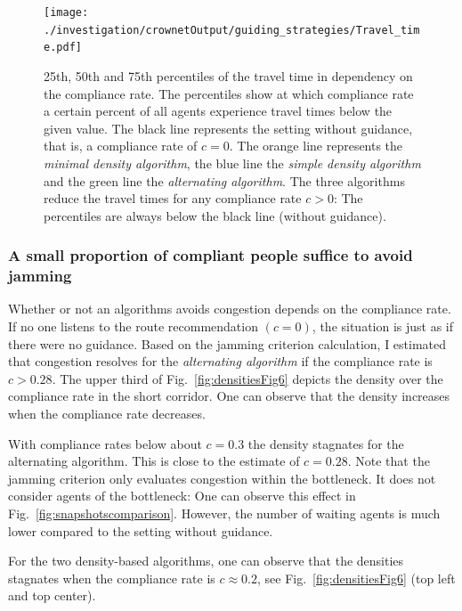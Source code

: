 \begin{figure}[h!]
\texttt{[image: ./investigation/crownetOutput/guiding\_strategies/Travel\_time.pdf]} 
\caption[25th, 50\% and 75\%-quartiles of the travel time in dependency of the compliance rate.]{25th, 50th and 75th percentiles of the travel time in dependency on the compliance rate. The percentiles show at which compliance rate a certain percent of all agents experience travel times below the given value.
The black line represents the setting without guidance, that is, a compliance rate of $c=0$. The orange line represents the \textit{minimal density algorithm}, the blue line the \textit{simple density algorithm} and the green line the \textit{alternating algorithm}.
The three algorithms reduce the travel times for any compliance rate $c>0$: The percentiles are always below the black line (without guidance).}
\label{fig:travelFig11}
\end{figure}



\subsubsection{A small proportion of compliant people suffice to avoid jamming}

Whether or not an algorithms avoids congestion depends on the compliance rate. If no one listens to the route recommendation $(c=0)$, the situation is just as if there were no guidance. Based on the jamming criterion calculation, I estimated that congestion resolves for the \textit{alternating algorithm} if the compliance rate is $c>0.28$.
The upper third of Fig.~\ref{fig:densitiesFig6} depicts the density over the compliance rate in the short corridor. One can observe that the density increases when the compliance rate decreases. 

With compliance rates below about $c=0.3$ the density stagnates for the alternating algorithm.
This is close to the estimate of $c=0.28$. Note that the jamming criterion only evaluates congestion within the bottleneck. It does not consider agents of the bottleneck: One can observe this effect in Fig.~\ref{fig:snapshotscomparison}. However, the number of waiting agents is much lower compared to the setting without guidance. 

For the two density-based algorithms, one can observe that the densities stagnates when the compliance rate is $c\approx0.2$, see Fig.~\ref{fig:densitiesFig6} (top left and top center). 



